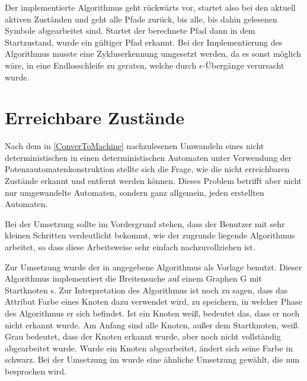 Der implementierte Algorithmus geht rückwärts vor, startet also bei den aktuell
aktiven Zuständen und geht alle Pfade zurück, bis alle, bis dahin gelesenen
Symbole abgearbeitet sind. Startet der berechnete Pfad dann in dem
Startzustand, wurde ein gültiger Pfad erkannt. Bei der Implementierung des
Algorithmus musste eine Zykluserkennung umgesetzt werden, da es sonst möglich
wäre, in eine Endlosschleife zu geraten, welche durch $\epsilon$-Übergänge
verursacht wurde.\vspace{10pt}


\section{Erreichbare Zustände}\label{ReachableStates}

Nach dem in \ref{ConverToMachine} nachzulesenen Umwandeln eines nicht
deterministischen in einen deterministischen Automaten unter Verwendung der
Potenzautomatenkonstruktion stellte sich die Frage, wie die nicht erreichbaren
Zustände erkannt und entfernt werden können. Dieses Problem betrifft aber nicht
nur umgewandelte Automaten, sondern ganz allgemein, jeden erstellten
Automaten.\vspace{10pt}

Bei der Umsetzung sollte im Vordergrund stehen, dass der Benutzer mit sehr
kleinen Schritten verdeutlicht bekommt, wie der zugrunde liegende Algorithmus
arbeitet, so dass diese Arbeitsweise sehr einfach nachzuvollziehen
ist.\vspace{10pt}

Zur Umsetzung wurde der in \cite[S. 536]{Algorithmen} angegebene Algorithmus
als Vorlage benutzt. Dieser Algorithmus implementiert die Breitensuche auf
einem Graphen G mit Startknoten s. Zur Interpretation des Algorithmus ist noch
zu sagen, dass das Attribut Farbe eines Knoten dazu verwendet wird, zu
speichern, in welcher Phase des Algorithmus er sich befindet. Ist ein Knoten
weiß, bedeutet das, dass er noch nicht erkannt wurde. Am Anfang sind alle
Knoten, außer dem Startknoten, weiß. Grau bedeutet, dass der Knoten erkannt
wurde, aber noch nicht vollständig abgearbeitet wurde. Wurde ein Knoten
abgearbeitet, ändert sich seine Farbe in schwarz. Bei der Umsetzung im \gtitool
wurde eine ähnliche Umsetzung gewählt, die nun besprochen wird.\vspace{10pt}

